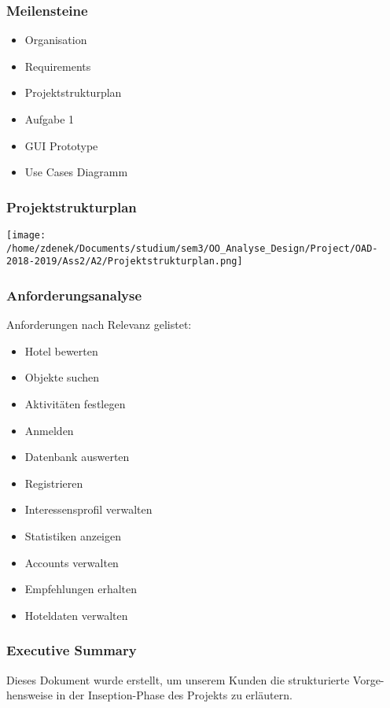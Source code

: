 \documentclass[a4paper]{article}
\begin{document}
\subsubsection{Meilensteine}

\begin{itemize}
\item Organisation
\item Requirements
\item Projektstrukturplan
\item Aufgabe 1
\item GUI Prototype
\item Use Cases Diagramm
\end{itemize}

\subsubsection{Projektstrukturplan}

\texttt{[image: /home/zdenek/Documents/studium/sem3/OO\_Analyse\_Design/Project/OAD-2018-2019/Ass2/A2/Projektstrukturplan.png]}

\subsubsection{Anforderungsanalyse}

Anforderungen nach Relevanz gelistet:

\begin{itemize}
\item Hotel bewerten
\item Objekte suchen
\item Aktivitäten festlegen
\item Anmelden
\item Datenbank auswerten
\item Registrieren
\item Interessensprofil verwalten
\item Statistiken anzeigen
\item Accounts verwalten
\item Empfehlungen erhalten
\item Hoteldaten verwalten
\end{itemize}

\subsubsection{Executive Summary}

Dieses Dokument wurde erstellt, um unserem Kunden die strukturierte Vorge-
hensweise in der Inseption-Phase des Projekts zu erläutern.
\end{document}
